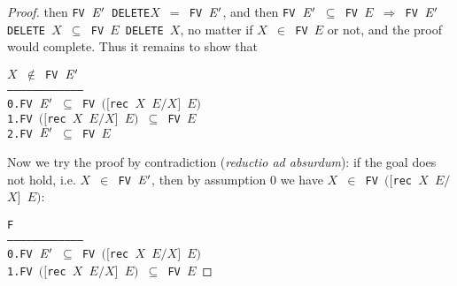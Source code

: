 \documentclass[GCNS]{yincog}
\renewcommand{\HOLinline}[1]{\mbox{\textup{\texttt{#1}}}}
\renewcommand{\HOLConst}[1]{\texttt{#1}}
\renewcommand{\HOLFreeVar}[1]{\ensuremath{\mathit{#1}}}
\renewcommand{\HOLSymConst}[1]{#1}
\renewcommand{\HOLTokenIn}{\ensuremath{\in}}
\renewcommand{\HOLTokenSubset}{\ensuremath{\subseteq}}
\renewcommand{\HOLTokenNotIn}{\ensuremath{\notin}}
\theoremstyle{remark}
\theoremstyle{theorem}
\theoremstyle{remark}
\renewcommand{\HOLTokenImp}{\ensuremath{\Longrightarrow}}
\begin{document}
\begin{proof}
then
\HOLinline{\HOLConst{FV} \ensuremath{\HOLFreeVar{E}\sp{\prime}} \HOLConst{DELETE}}\break \HOLinline{\HOLFreeVar{X} \HOLSymConst{\ensuremath{=}} \HOLConst{FV} \ensuremath{\HOLFreeVar{E}\sp{\prime}}},
and then
\HOLinline{\HOLConst{FV} \ensuremath{\HOLFreeVar{E}\sp{\prime}} \HOLSymConst{\HOLTokenSubset{}} \HOLConst{FV} \HOLFreeVar{E} \HOLSymConst{\HOLTokenImp{}} \HOLConst{FV} \ensuremath{\HOLFreeVar{E}\sp{\prime}} \HOLConst{DELETE} \HOLFreeVar{X} \HOLSymConst{\HOLTokenSubset{}} \HOLConst{FV} \HOLFreeVar{E} \HOLConst{DELETE} \HOLFreeVar{X}},
no matter if
\HOLinline{\HOLFreeVar{X} \HOLSymConst{\HOLTokenIn{}} \HOLConst{FV} \HOLFreeVar{E}}
or not, and the proof would complete. Thus it remains to show that
%
\begin{alltt}
        \HOLinline{\HOLFreeVar{X} \HOLSymConst{\HOLTokenNotIn{}} \HOLConst{FV} \ensuremath{\HOLFreeVar{E}\sp{\prime}}}
   ------------------------------------
    0.  \HOLinline{\HOLConst{FV} \ensuremath{\HOLFreeVar{E}\sp{\prime}} \HOLSymConst{\HOLTokenSubset{}} \HOLConst{FV} \ensuremath{(}\ensuremath{[}\HOLConst{rec} \HOLFreeVar{X} \HOLFreeVar{E}\ensuremath{/}\HOLFreeVar{X}\ensuremath{]} \HOLFreeVar{E}\ensuremath{)}}
    1.  \HOLinline{\HOLConst{FV} \ensuremath{(}\ensuremath{[}\HOLConst{rec} \HOLFreeVar{X} \HOLFreeVar{E}\ensuremath{/}\HOLFreeVar{X}\ensuremath{]} \HOLFreeVar{E}\ensuremath{)} \HOLSymConst{\HOLTokenSubset{}} \HOLConst{FV} \HOLFreeVar{E}}
    2.  \HOLinline{\HOLConst{FV} \ensuremath{\HOLFreeVar{E}\sp{\prime}} \HOLSymConst{\HOLTokenSubset{}} \HOLConst{FV} \HOLFreeVar{E}}
\end{alltt}
%
Now we try the proof by contradiction (\emph{reductio ad absurdum}): if
the goal does not hold, i.e.
\HOLinline{\HOLFreeVar{X} \HOLSymConst{\HOLTokenIn{}} \HOLConst{FV} \ensuremath{\HOLFreeVar{E}\sp{\prime}}},
then by assumption 0 we have
\HOLinline{\HOLFreeVar{X} \HOLSymConst{\HOLTokenIn{}} \HOLConst{FV} \ensuremath{(}\ensuremath{[}\HOLConst{rec} \HOLFreeVar{X} \HOLFreeVar{E}\ensuremath{/}\HOLFreeVar{X}\ensuremath{]} \HOLFreeVar{E}\ensuremath{)}}:
%
\begin{alltt}
        F
   ------------------------------------
    0.  \HOLinline{\HOLConst{FV} \ensuremath{\HOLFreeVar{E}\sp{\prime}} \HOLSymConst{\HOLTokenSubset{}} \HOLConst{FV} \ensuremath{(}\ensuremath{[}\HOLConst{rec} \HOLFreeVar{X} \HOLFreeVar{E}\ensuremath{/}\HOLFreeVar{X}\ensuremath{]} \HOLFreeVar{E}\ensuremath{)}}
    1.  \HOLinline{\HOLConst{FV} \ensuremath{(}\ensuremath{[}\HOLConst{rec} \HOLFreeVar{X} \HOLFreeVar{E}\ensuremath{/}\HOLFreeVar{X}\ensuremath{]} \HOLFreeVar{E}\ensuremath{)} \HOLSymConst{\HOLTokenSubset{}} \HOLConst{FV} \HOLFreeVar{E}}

\end{alltt}
\end{proof}
\end{document}
